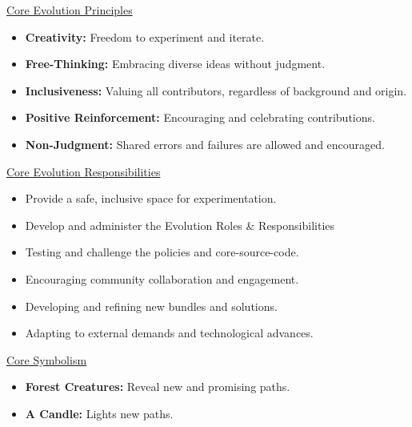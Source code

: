 \documentclass[twocolumn,10pt]{article}
\begin{document}
\vspace{20pt}
\begin{minipage}{0.95\linewidth}
    \begin{tcolorbox}
        \begin{center}\underline{Core Evolution Principles}\end{center}
        \begin{itemize}
            \item \textbf{Creativity:} Freedom to experiment and iterate.
            \item \textbf{Free-Thinking:} Embracing diverse ideas without judgment.
            \item \textbf{Inclusiveness:} Valuing all contributors, regardless of background and origin.
            \item \textbf{Positive Reinforcement:} Encouraging and celebrating contributions.
            \item \textbf{Non-Judgment:} Shared errors and failures are allowed and encouraged.
        \end{itemize}


        \begin{center}\underline{Core Evolution Responsibilities}\end{center}
        \begin{itemize}
            \item Provide a safe, inclusive space for experimentation.
            \item Develop and administer the Evolution Roles \& Responsibilities
            \item Testing and challenge the policies and core-source-code.
            \item Encouraging community collaboration and engagement.
            \item Developing and refining new bundles and solutions.
            \item Adapting to external demands and technological advances.
        \end{itemize}

        \begin{center}\underline{Core Symbolism}\end{center}
        \begin{itemize}
            \item \textbf{Forest Creatures:} Reveal new and promising paths.
            \item \textbf{A Candle:} Lights new paths.
        \end{itemize}
    \end{tcolorbox}
\end{minipage}
\end{document}
